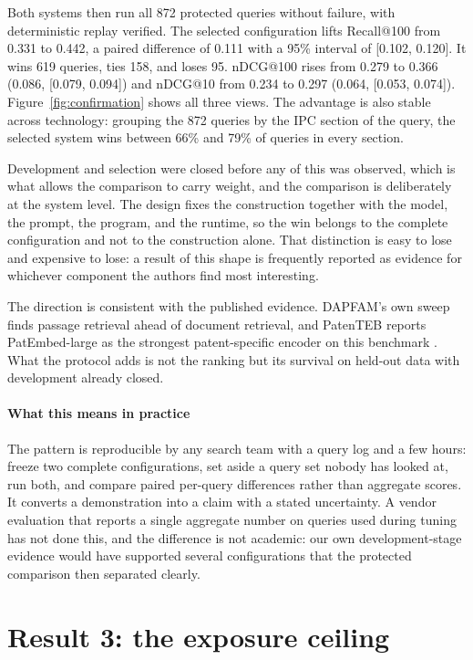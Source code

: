 \documentclass[preprint,11pt,authoryear]{elsarticle}          %
\begin{document}
Both systems then run all 872 protected queries without failure, with deterministic replay verified. The selected configuration lifts Recall@100 from 0.331 to 0.442, a paired difference of 0.111 with a 95\% interval of [0.102, 0.120]. It wins 619 queries, ties 158, and loses 95. nDCG@100 rises from 0.279 to 0.366 (0.086, [0.079, 0.094]) and nDCG@10 from 0.234 to 0.297 (0.064, [0.053, 0.074]). Figure~\ref{fig:confirmation} shows all three views. The advantage is also stable across technology: grouping the 872 queries by the IPC section of the query, the selected system wins between 66\% and 79\% of queries in every section.

Development and selection were closed before any of this was observed, which is what allows the comparison to carry weight, and the comparison is deliberately at the system level. The design fixes the construction together with the model, the prompt, the program, and the runtime, so the win belongs to the complete configuration and not to the construction alone. That distinction is easy to lose and expensive to lose: a result of this shape is frequently reported as evidence for whichever component the authors find most interesting.

The direction is consistent with the published evidence. DAPFAM's own sweep finds passage retrieval ahead of document retrieval, and PatenTEB reports PatEmbed-large as the strongest patent-specific encoder on this benchmark \citep{ayaou2026dapfam,ayaou2025patenteb}. What the protocol adds is not the ranking but its survival on held-out data with development already closed.

\paragraph{What this means in practice} The pattern is reproducible by any search team with a query log and a few hours: freeze two complete configurations, set aside a query set nobody has looked at, run both, and compare paired per-query differences rather than aggregate scores. It converts a demonstration into a claim with a stated uncertainty. A vendor evaluation that reports a single aggregate number on queries used during tuning has not done this, and the difference is not academic: our own development-stage evidence would have supported several configurations that the protected comparison then separated clearly.

\section{Result 3: the exposure ceiling}
\label{sec:exposure}
\end{document}

